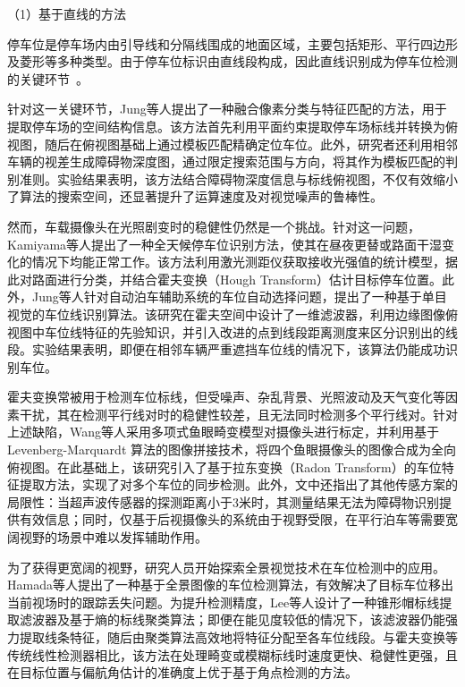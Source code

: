 （1）基于直线的方法

停车位是停车场内由引导线和分隔线围成的地面区域，主要包括矩形、平行四边形及菱形等多种类型。由于停车位标识由直线段构成，因此直线识别成为停车位检测的关键环节~\cite{ma2021research}。

针对这一关键环节，Jung等人\cite{jung20063d}提出了一种融合像素分类与特征匹配的方法，用于提取停车场的空间结构信息。该方法首先利用平面约束提取停车场标线并转换为俯视图，随后在俯视图基础上通过模板匹配精确定位车位。此外，研究者还利用相邻车辆的视差生成障碍物深度图，通过限定搜索范围与方向，将其作为模板匹配的判别准则。实验结果表明，该方法结合障碍物深度信息与标线俯视图，不仅有效缩小了算法的搜索空间，还显著提升了运算速度及对视觉噪声的鲁棒性。

然而，车载摄像头在光照剧变时的稳健性仍然是一个挑战。针对这一问题，Kamiyama等人\cite{kamiyama2019recognition}提出了一种全天候停车位识别方法，使其在昼夜更替或路面干湿变化的情况下均能正常工作。该方法利用激光测距仪获取接收光强值的统计模型，据此对路面进行分类，并结合霍夫变换（Hough Transform）估计目标停车位置。此外，Jung等人\cite{jung20063d}针对自动泊车辅助系统的车位自动选择问题，提出了一种基于单目视觉的车位线识别算法。该研究在霍夫空间中设计了一维滤波器，利用边缘图像俯视图中车位线特征的先验知识，并引入改进的点到线段距离测度来区分识别出的线段。实验结果表明，即便在相邻车辆严重遮挡车位线的情况下，该算法仍能成功识别车位。

霍夫变换常被用于检测车位标线，但受噪声、杂乱背景、光照波动及天气变化等因素干扰，其在检测平行线对时的稳健性较差，且无法同时检测多个平行线对。针对上述缺陷，Wang等人\cite{wang2014automatic}采用多项式鱼眼畸变模型对摄像头进行标定，并利用基于 Levenberg-Marquardt 算法的图像拼接技术，将四个鱼眼摄像头的图像合成为全向俯视图。在此基础上，该研究引入了基于拉东变换（Radon Transform）的车位特征提取方法，实现了对多个车位的同步检测。此外，文中还指出了其他传感方案的局限性：当超声波传感器的探测距离小于3米时，其测量结果无法为障碍物识别提供有效信息；同时，仅基于后视摄像头的系统由于视野受限，在平行泊车等需要宽阔视野的场景中难以发挥辅助作用。

为了获得更宽阔的视野，研究人员开始探索全景视觉技术在车位检测中的应用。Hamada等人\cite{hamada2015surround}提出了一种基于全景图像的车位检测算法，有效解决了目标车位移出当前视场时的跟踪丢失问题。为提升检测精度，Lee等人\cite{lee2016available}设计了一种锥形帽标线提取滤波器及基于熵的标线聚类算法；即便在能见度较低的情况下，该滤波器仍能强力提取线条特征，随后由聚类算法高效地将特征分配至各车位线段。与霍夫变换等传统线性检测器相比，该方法在处理畸变或模糊标线时速度更快、稳健性更强，且在目标位置与偏航角估计的准确度上优于基于角点检测的方法。

